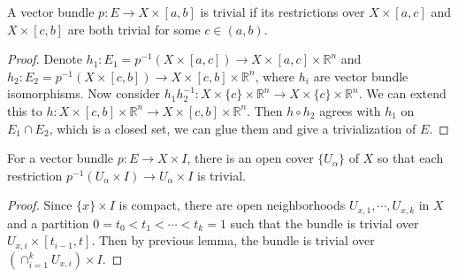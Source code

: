 \begin{lemma} A vector bundle $p:E\rightarrow X\times [a,b]$ is trivial if its restrictions over $X\times [a,c]$ and $X\times [c,b]$ are both trivial for some $c\in (a,b)$.
\end{lemma}
\begin{proof}
Denote $h_1:E_1=p^{-1}(X\times [a,c])\rightarrow X\times [a,c]\times \mathbb{R}^n$ and $h_2:E_2=p^{-1}(X\times [c,b])\rightarrow X\times [c,b]\times \mathbb{R}^n$, where $h_i$ are vector bundle isomorphisms. Now consider $h_1 h_2^{-1}:X\times \{c\}\times \mathbb{R}^n\rightarrow X\times \{c\}\times \mathbb{R}^n$. We can extend this to $h:X\times [c,b]\times \mathbb{R}^n\rightarrow X\times [c,b]\times \mathbb{R}^n$. Then $h\circ h_2$ agrees with $h_1$ on $E_1\cap E_2$, which is a closed set, we can glue them and give a trivialization of $E$.
\end{proof}

\begin{lemma} For a vector bundle $p:E\rightarrow X\times I$, there is an open cover $\{U_\alpha\}$ of $X$ so that each restriction $p^{-1}(U_\alpha\times I)\rightarrow U_\alpha\times I$ is trivial.
\end{lemma}
\begin{proof}
Since $\{x\}\times I$ is compact, there are open neighborhoods $U_{x,1},\cdots,U_{x,k}$ in $X$ and a partition $0=t_0<t_1<\cdots<t_k=1$ such that the  bundle is trivial over $U_{x,i}\times [t_{i-1},t]$. Then by previous lemma, the bundle is trivial over $(\cap_{i=1}^k U_{x,i})\times I$.
\end{proof}

